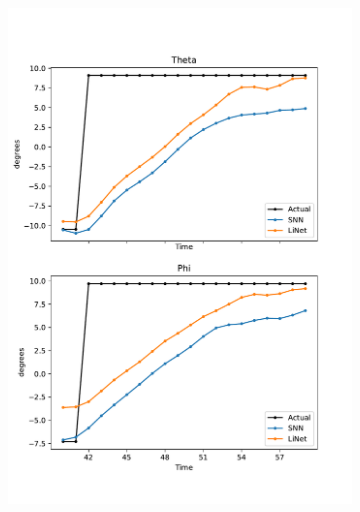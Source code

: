 \documentclass [MS] {UCLAthesis}
\begin{document}
\begin{figure}
\begin{subfigure}[b]{0.2\textwidth}
        \includegraphics[width=\textwidth]{saccade_human_ori_delta}
        \caption{}
        \label{fig:saccade_human_ori_delta}
    \end{subfigure}

    \caption[]{}
    \label{fig:saccade_ori}
\end{figure}
\end{document}
